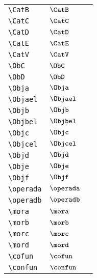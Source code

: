 \begin{longtable}{lll}
 {\color[rgb]{0.5,0.5,0.5}\texttt{\textbackslash CatB}} & $\CatB$ & \\ 
 {\color[rgb]{0.5,0.5,0.5}\texttt{\textbackslash CatC}} & $\CatC$ & \\ 
 {\color[rgb]{0.5,0.5,0.5}\texttt{\textbackslash CatD}} & $\CatD$ & \\ 
 {\color[rgb]{0.5,0.5,0.5}\texttt{\textbackslash CatE}} & $\CatE$ & \\ 
 {\color[rgb]{0.5,0.5,0.5}\texttt{\textbackslash CatV}} & $\CatV$ & \\ 
 {\color[rgb]{0.5,0.5,0.5}\texttt{\textbackslash ObC}} & $\ObC$ & \\ 
 {\color[rgb]{0.5,0.5,0.5}\texttt{\textbackslash ObD}} & $\ObD$ & \\ 
 {\color[rgb]{0.5,0.5,0.5}\texttt{\textbackslash Obja}} & $\Obja$ & \\ 
 {\color[rgb]{0.5,0.5,0.5}\texttt{\textbackslash Objael}} & $\Objael$ & \\ 
 {\color[rgb]{0.5,0.5,0.5}\texttt{\textbackslash Objb}} & $\Objb$ & \\ 
 {\color[rgb]{0.5,0.5,0.5}\texttt{\textbackslash Objbel}} & $\Objbel$ & \\ 
 {\color[rgb]{0.5,0.5,0.5}\texttt{\textbackslash Objc}} & $\Objc$ & \\ 
 {\color[rgb]{0.5,0.5,0.5}\texttt{\textbackslash Objcel}} & $\Objcel$ & \\ 
 {\color[rgb]{0.5,0.5,0.5}\texttt{\textbackslash Objd}} & $\Objd$ & \\ 
 {\color[rgb]{0.5,0.5,0.5}\texttt{\textbackslash Obje}} & $\Obje$ & \\ 
 {\color[rgb]{0.5,0.5,0.5}\texttt{\textbackslash Objf}} & $\Objf$ & \\ 
 {\color[rgb]{0.5,0.5,0.5}\texttt{\textbackslash operada}} & $\operada$ & \\ 
 {\color[rgb]{0.5,0.5,0.5}\texttt{\textbackslash operadb}} & $\operadb$ & \\ 
 {\color[rgb]{0.5,0.5,0.5}\texttt{\textbackslash mora}} & $\mora$ & \\ 
 {\color[rgb]{0.5,0.5,0.5}\texttt{\textbackslash morb}} & $\morb$ & \\ 
 {\color[rgb]{0.5,0.5,0.5}\texttt{\textbackslash morc}} & $\morc$ & \\ 
 {\color[rgb]{0.5,0.5,0.5}\texttt{\textbackslash mord}} & $\mord$ & \\ 
 {\color[rgb]{0.5,0.5,0.5}\texttt{\textbackslash cofun}} & $\cofun$ & \\ 
 {\color[rgb]{0.5,0.5,0.5}\texttt{\textbackslash confun}} & $\confun$ & \\ 

\end{longtable}
